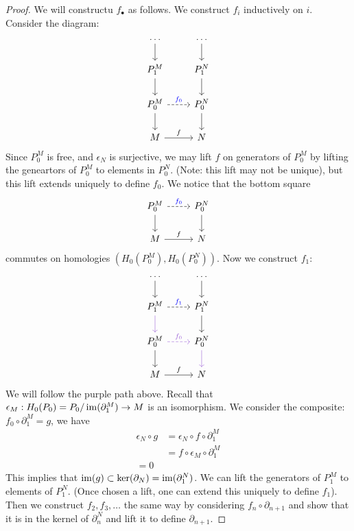 \begin{proof}
    We will constructu $f_\bullet$ as follows. We construct $f_i$ inductively on $i$. Consider the diagram:
    \[\begin{tikzcd}
        \dots & \dots \\
        {P_1^M} & {P_1^N} \\
        {P_0^M} & {P_0^N} \\
        M & N
        \arrow[from=1-1, to=2-1]
        \arrow[from=1-2, to=2-2]
        \arrow[from=2-1, to=3-1]
        \arrow[from=2-2, to=3-2]
        \arrow["{\textcolor{blue}{f_0}}", dashed, from=3-1, to=3-2]
        \arrow[from=3-1, to=4-1]
        \arrow[from=3-2, to=4-2]
        \arrow["f", from=4-1, to=4-2]
    \end{tikzcd}\]
    Since $P_0^M$ is free, and $\epsilon_N$ is surjective, we may lift $f$ on generators of $P_0^M$ by lifting the geneartors of $P_0^M$ to elements in $P_0^N$. (Note: this lift may not be unique), but this lift extends uniquely to define $f_0$. We notice that the bottom square 
    \[\begin{tikzcd}
        {P_0^M} & {P_0^N} \\
        M & N
        \arrow["{\textcolor{blue}{f_0}}", dashed, from=1-1, to=1-2]
        \arrow[from=1-1, to=2-1]
        \arrow[from=1-2, to=2-2]
        \arrow["f", from=2-1, to=2-2]
    \end{tikzcd}\]
    commutes on homologies $(H_0(P_0^M), H_0(P_0^N))$. Now we construct $f_1$:
    \[\begin{tikzcd}
        \dots & \dots \\
        {P_1^M} & {P_1^N} \\
        {P_0^M} & {P_0^N} \\
        M & N
        \arrow[from=1-1, to=2-1]
        \arrow[from=1-2, to=2-2]
        \arrow["{\textcolor{blue}{f_1}}", dashed, from=2-1, to=2-2]
        \arrow[color={rgb,255:red,153;green,92;blue,214}, from=2-1, to=3-1]
        \arrow[from=2-2, to=3-2]
        \arrow["{f_0}", color={rgb,255:red,153;green,92;blue,214}, dashed, from=3-1, to=3-2]
        \arrow[from=3-1, to=4-1]
        \arrow[color={rgb,255:red,153;green,92;blue,214}, from=3-2, to=4-2]
        \arrow["f", from=4-1, to=4-2]
    \end{tikzcd}\]
    We will follow the purple path above. Recall that $\epsilon_M: H_0(P_0)=P_0/\operatorname{im}(\partial_1^M)\to M$ is an isomorphism. We consider the composite: $f_0\circ\partial_1^M=g$, we have 
    \begin{align*}
        \epsilon_N\circ g&=\epsilon_N\circ f\circ\partial_1^M\\
        &=f\circ\epsilon_M\circ\partial_1^M\\
        =0
    \end{align*}
    This implies that $\operatorname{im}(g)\subset\ker(\partial_N)=\operatorname{im}(\partial_1^N)$. We can lift the generators of $P_1^M$ to elements of $P_1^N$. (Once chosen a lift, one can extend this uniquely to define $f_1$). Then we construct $f_2,f_3,\dots$ the same way by considering $f_n\circ\partial_{n+1}$ and show that it is in the kernel of $\partial_n^N$ and lift it to define $\partial_{n+1}$.


\end{proof}
